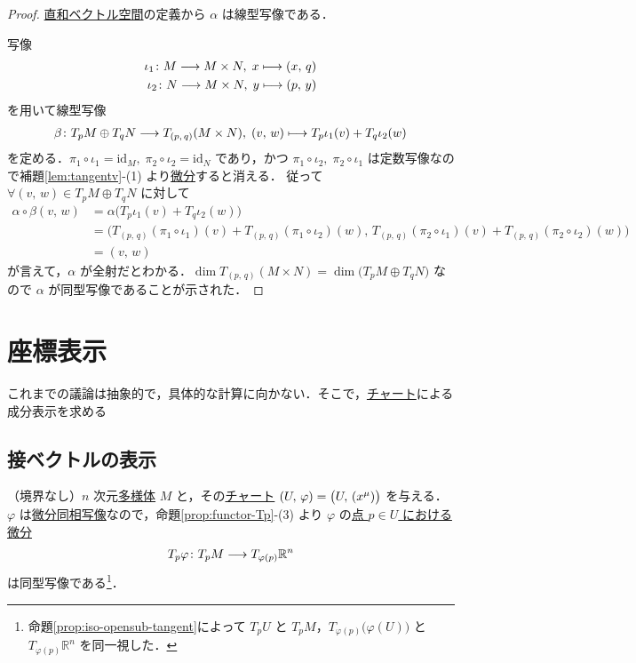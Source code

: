 \documentclass[geometry_main]{subfiles}
\begin{document}
\begin{proof}
	\hyperref[prop:product-vec]{直和ベクトル空間}の定義から $\alpha$ は線型写像である．
	
	\cinfty 写像
	\begin{align}
		\iota_1 \colon M \longrightarrow M \times N,\; x \longmapsto (x,\, q) \\
		\iota_2 \colon N \longrightarrow M \times N,\; y \longmapsto (p,\, y)
	\end{align}
	を用いて線型写像
	\begin{align}
		\beta \colon T_p M \oplus T_q N \longrightarrow T_{(p,\, q)} (M \times N),\; (v,\, w) \longmapsto T_p \iota_1(v) + T_q \iota_2(w)
	\end{align}
	を定める．$\pi_1 \circ \iota_1 = \mathrm{id}_M,\; \pi_2 \circ \iota_2 = \mathrm{id}_N$ であり，かつ $\pi_1 \circ \iota_2,\; \pi_2 \circ \iota_1$ は定数写像なので補題\ref{lem:tangentv}-(1) より\hyperref[def:functor-Tp]{微分}すると消える． 
	従って $\forall (v,\, w) \in T_p M \oplus T_q N $ に対して
	\begin{align}
		\alpha \circ \beta (v,\, w) &= \alpha \bigl( T_p \iota_1(v) + T_q \iota_2 (w) \bigr) \\
		&= \bigl( T_{(p,\, q)} (\pi_1 \circ \iota_1)(v) + T_{(p,\, q)} (\pi_1 \circ \iota_2)(w),\, T_{(p,\, q)} (\pi_2 \circ \iota_1)(v) + T_{(p,\, q)} (\pi_2 \circ \iota_2)(w) \bigr) \\
		&= (v,\, w)
	\end{align}
	が言えて，$\alpha$ が全射だとわかる．$\dim T_{(p,\, q)} (M \times N) = \dim \bigl( T_p M \oplus T_q N \bigr)$ なので $\alpha$ が同型写像であることが示された．
\end{proof}


\section{座標表示}

これまでの議論は抽象的で，具体的な計算に向かない．そこで，\hyperref[def.localcoord]{チャート}による成分表示を求める

\subsection{接ベクトルの表示}

（境界なし）$n$ 次元\hyperref[diffmani]{\cinfty 多様体} $M$ と，その\hyperref[diffmani]{\cinfty チャート} $(U,\, \varphi) = \bigl(U,\, (x^\mu)\bigr)$ を与える．
$\varphi$ は\hyperref[def.diff]{微分同相写像}なので，命題\ref{prop:functor-Tp}-(3) より $\varphi$ の\hyperref[def:functor-Tp]{点 $p \in U$ における微分}
\begin{align}
	\label{eq:iso-coord-1}
	T_p \varphi \colon T_p M \longrightarrow T_{\varphi(p)} \mathbb{R}^n
\end{align}
は同型写像である\footnote{命題\ref{prop:iso-opensub-tangent}によって $T_p U$ と $T_p M$，$T_{\varphi(p)} \bigl( \varphi(U) \bigr)$ と $T_{\varphi(p)} \mathbb{R}^n$ を同一視した．}．
\end{document}
